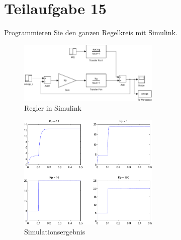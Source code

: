 \section{Teilaufgabe 15}
\begin{aufgabe}
    Programmieren Sie den ganzen Regelkreis mit Simulink.
\end{aufgabe}
\begin{figure}[h!]
    \centering
    \includegraphics[width=0.6\textwidth]{15/regler.pdf}
    \caption{Regler in Simulink}
    \label{fig:15}
\end{figure}
\begin{figure}[h!]
    \centering
    \includegraphics[width=0.6\textwidth]{15/regler_plot.pdf}
    \caption{Simulationsergebnis}
    \label{fig:15plot}
\end{figure}

